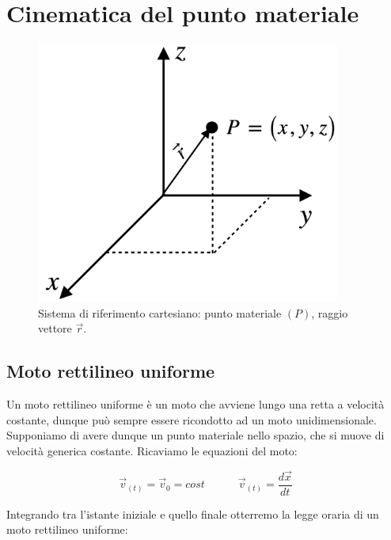 \chapter{Cinematica del punto materiale}

\begin{figure}[htbp]
\begin{center}
\includegraphics[width=10cm]{images/assi.png} 
\caption{Sistema di riferimento cartesiano: punto materiale $(P)$, raggio vettore $\vec r$.}
\label{default}
\end{center}
\end{figure}



\section{Moto rettilineo uniforme}
Un moto rettilineo uniforme è un moto che avviene lungo una retta a velocità costante, dunque può sempre essere ricondotto ad un moto unidimensionale.\\
Supponiamo di avere dunque un punto materiale nello spazio, che si muove di velocità generica costante. Ricaviamo le equazioni del moto:




\begin{equation}
\vec v_{(t)} = \vec v_0 = cost\quad\quad\quad \vec v_{(t)} = \frac{d\vec x}{dt}
\end{equation}

Integrando tra l'istante iniziale e quello finale otterremo la legge oraria di un moto rettilineo uniforme:

